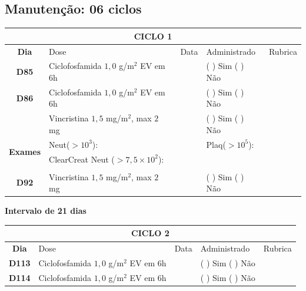 \documentclass[11pt,a4paper,oldfontcommands]{memoir}
\begin{document}
\subsection{Manutenção: 06 ciclos}

\begin{center}
\begin{table}[H]
    \begin{tabular}{p{1cm}p{6cm}|p{1cm}|p{3cm}|p{2.5cm}}
    \hline
	\multicolumn{5}{c}{\textbf{CICLO 1}}\\
	\hline
    \multicolumn{1}{c|}{\multirow{1}{*}{\textbf{Dia}}}&{Dose}&{Data}&{Administrado}&{Rubrica} \\
    \hline
    \multicolumn{1}{c|}{\multirow{1}{*}{\textbf{D85}}}&{Ciclofosfamida \(1,0\) g/m\(^2\) EV em 6h}&&{(  ) Sim (  ) Não}&\\
    \multicolumn{1}{c|}{\multirow{1}{*}{\textbf{D86}}}&{Ciclofosfamida \(1,0\) g/m\(^2\) EV em 6h}&&{(  ) Sim (  ) Não}&\\
    \multicolumn{1}{c|}{\multirow{1}{*}{\textbf{}}}&{Vincristina \(1,5\) mg/m\(^2\), max \(2\) mg}&&{(  ) Sim (  ) Não}&\\
    \hline
    \multicolumn{1}{c|}{\multirow{2}{*}{\textbf{Exames}}}&\multicolumn{2}{l|}{Neut(\(>10^3\)):}&{Plaq(\(>10^5\)):}&\\
    \cline{2-5}
    \multicolumn{1}{c|}{\multirow{2}{*}{{}}}&\multicolumn{2}{l|}{ClearCreat Neut (\(>7,5\times10^2\)):}&{}&{}\\
    \hline
    \\
    \hline
    \multicolumn{1}{c|}{\multirow{1}{*}{\textbf{D92}}}&{Vincristina \(1,5\) mg/m\(^2\), max \(2\) mg}&&{(  ) Sim (  ) Não}&\\
    \hline
\end{tabular}
\end{table}
\textbf{Intervalo de 21 dias}
\begin{table}[H]
\begin{tabular}{p{1cm}p{6cm}|p{1cm}|p{3cm}|p{2.5cm}}
    \hline
	\multicolumn{5}{c}{\textbf{CICLO 2}}\\
	\hline
    \multicolumn{1}{c|}{\multirow{1}{*}{\textbf{Dia}}}&{Dose}&{Data}&{Administrado}&{Rubrica} \\
    \hline
    \multicolumn{1}{c|}{\multirow{1}{*}{\textbf{D113}}}&{Ciclofosfamida \(1,0\) g/m\(^2\) EV em 6h}&&{(  ) Sim (  ) Não}&\\
    \multicolumn{1}{c|}{\multirow{1}{*}{\textbf{D114}}}&{Ciclofosfamida \(1,0\) g/m\(^2\) EV em 6h}&&{(  ) Sim (  ) Não}&\\

\end{tabular}
\end{table}
\end{center}
\end{document}

